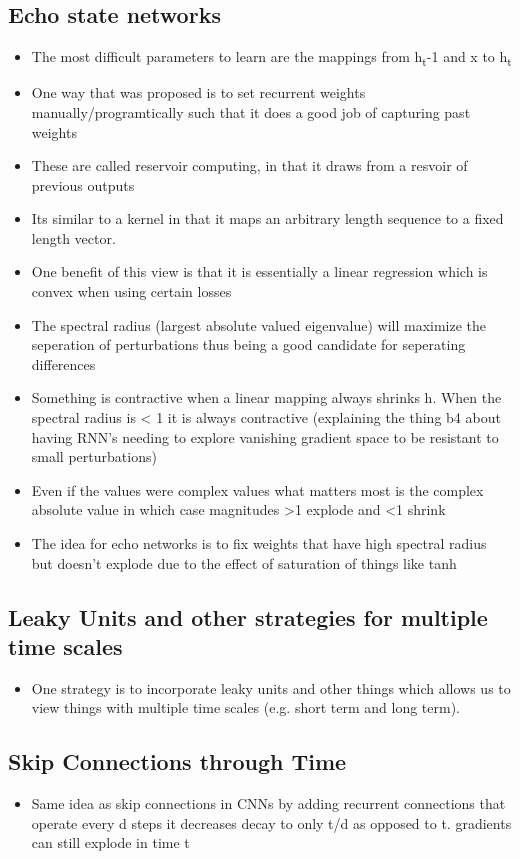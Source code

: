 \documentclass[11pt]{article}
\begin{document}
\subsection{Echo state networks}
\label{sec:orgb0f8a71}
\begin{itemize}
\item The most difficult parameters to learn are the mappings from h\textsubscript{t}-1 and x to h\textsubscript{t}
\item One way that was proposed is to set recurrent weights manually/programtically such that it does a good job of capturing past weights
\item These are called reservoir computing, in that it draws from a resvoir of previous outputs
\item Its similar to a kernel in that it maps an arbitrary length sequence to a fixed length vector.
\item One benefit of this view is that it is essentially a linear regression which is convex when using certain losses
\item The spectral radius (largest absolute valued eigenvalue) will maximize the seperation of perturbations thus being a good candidate for seperating differences
\item Something is contractive when a linear mapping always shrinks h. When the spectral radius is < 1 it is always contractive (explaining the thing b4 about having RNN's needing to explore vanishing gradient space to be resistant to small perturbations)
\item Even if the values were complex values what matters most is the complex absolute value in which case magnitudes >1 explode and <1 shrink
\item The idea for echo networks is to fix weights that have high spectral radius but doesn't explode due to the effect of saturation of things like tanh
\end{itemize}
\subsection{Leaky Units and other strategies for multiple time scales}
\label{sec:orgb8fb4ef}
\begin{itemize}
\item One strategy is to incorporate leaky units and other things which allows us to view things with multiple time scales (e.g. short term and long term).
\end{itemize}
\subsection{Skip Connections through Time}
\label{sec:orgf479358}
\begin{itemize}
\item Same idea as skip connections in CNNs by adding recurrent connections that operate every d steps it decreases decay to only t/d as opposed to t. gradients can still explode in time t
\end{itemize}
\end{document}
